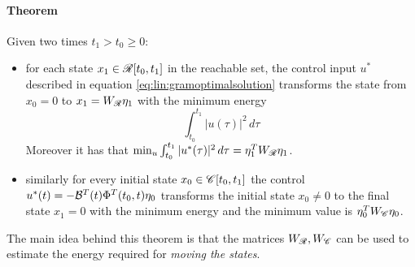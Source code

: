	\paragraph{Theorem} Given two times $t_1 > t_0 \geq 0$:
	\begin{itemize}
		\item for each state $x_1 \in \mathscr R[t_0,t_1]$ in the reachable set, the control input $u^*$ described in equation \ref{eq:lin:gramoptimalsolution} transforms the state from $x_0 = 0$ to $x_1 = W_\mathscr R \eta_1$ with the minimum energy
		\[ \int_{t_0}^{t_1} |u(\tau)|^2\, d\tau \]
		Moreover it has that $\min_u \int_{t_0}^{t_1} |u^*(\tau)|^2\, d\tau = \eta_1^T W_\mathscr R \eta_1$.
		\item similarly for every initial state $x_0 \in \mathscr C[t_0,t_1]$ the control $u^*(t) = -\mathcal{B}^T(t)\Phi^T(t_0,t)\eta_0$ transforms the initial state $x_0 \neq 0$ to the final state $x_1 = 0$ with the minimum energy and the minimum value is $\eta_0^T W_\mathscr C \eta_0$.
	\end{itemize}
	The main idea behind this theorem is that the matrices $W_\mathscr R,W_\mathscr C$ can be used to estimate the energy required for \textit{moving the states}.
		
